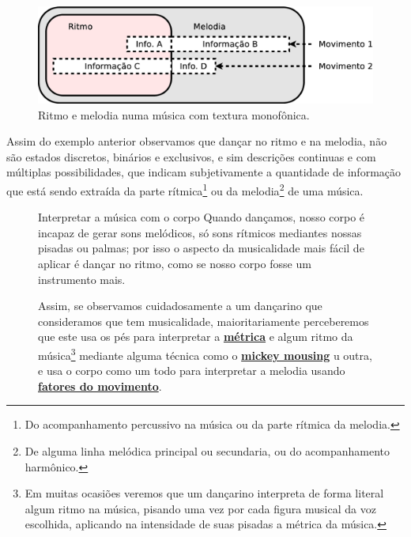 \begin{figure}[!h]
\centering
      \includegraphics[width=.75\linewidth]{chapters/cap-musicalidade-tecnica/ritmo-melodia-1}  
      \caption{Ritmo e melodia numa música com textura monofônica.}
      \label{fig:ritmo-melodia-1}
\end{figure}
Assim do exemplo anterior observamos que dançar no ritmo e na melodia, não são estados discretos, binários e exclusivos,
e sim descrições continuas e com múltiplas possibilidades, 
que indicam subjetivamente a quantidade de informação que está sendo extraída da parte rítmica\footnote{Do 
acompanhamento percussivo na música ou da parte rítmica da melodia.}
ou da melodia\footnote{De alguma linha melódica principal ou secundaria, ou do acompanhamento harmônico.}
de uma música.

\begin{figure}[!t]
\begin{tcbinformation}{Interpretar a música com o corpo}
Quando dançamos, nosso corpo é incapaz de gerar sons melódicos, só sons rítmicos
mediantes nossas pisadas ou palmas;
por isso o aspecto da musicalidade mais fácil de aplicar é dançar no ritmo,
como se nosso corpo fosse um instrumento mais.

Assim, se observamos cuidadosamente a um dançarino que consideramos que tem musicalidade,
maioritariamente perceberemos que este usa os pés para interpretar a 
\hyperref[def:Metrica]{\textbf{métrica}} e algum ritmo da música\footnote{Em muitas ocasiões 
veremos que um dançarino interpreta de forma literal algum ritmo na música,
pisando uma vez por cada figura musical da voz escolhida, 
aplicando na intensidade de suas pisadas a métrica da música.} mediante alguma técnica como o 
\hyperref[sec:mikeymousing]{\textbf{mickey mousing}} u outra,
e usa o corpo como um todo para interpretar a melodia usando 
\hyperref[subsec:fatordinamica]{\textbf{fatores do movimento}}.
\end{tcbinformation} 
\end{figure}

